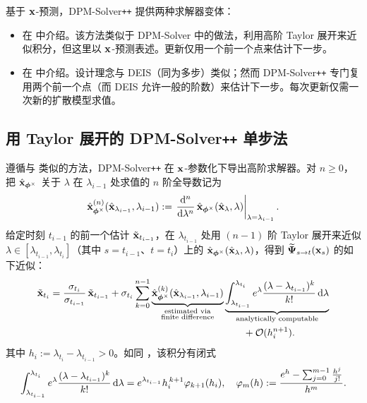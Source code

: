 基于 ${\mathbf{x}}$-预测，DPM-Solver\texttt{++} 提供两种求解器变体：
\begin{itemize}
    \item {} 在  中介绍。该方法类似于 DPM-Solver 中的做法，利用高阶 Taylor 展开来近似积分，但这里以 ${\mathbf{x}}$-预测表述。更新仅用一个前一个点来估计下一步。
    \item {} 在  中介绍。设计理念与 DEIS（同为多步）类似；然而 DPM-Solver\texttt{++} 专门复用两个前一个点（而 DEIS 允许一般的阶数）来估计下一步。每次更新仅需一次新的扩散模型求值。
\end{itemize}


\subsection{用 Taylor 展开的 DPM-Solver\texttt{++} 单步法}\label{subsec:dpm-solver++-single}
遵循与  类似的方法，DPM-Solver\texttt{++} 在 ${\mathbf{x}}$-参数化下导出高阶求解器。对 $n \ge 0$，把 $\hat{{\mathbf{x}}}_{{\bm{\phi}}^\times}$ 关于 $\lambda$ 在 $\lambda_{i-1}$ 处求值的 $n$ 阶全导数记为
\[
\hat{{\mathbf{x}}}_{{\bm{\phi}}^\times}^{(n)}(\hat{{\mathbf{x}}}_{\lambda_{i-1}}, \lambda_{i-1})
:= \left.\frac{\mathop{}\!\mathrm{d}^{n}}{\mathop{}\!\mathrm{d} \lambda^{n}}\,
\hat{{\mathbf{x}}}_{{\bm{\phi}}^\times}(\hat{{\mathbf{x}}}_\lambda, \lambda)\right|_{\lambda=\lambda_{i-1}}.
\]
给定时刻 $t_{i-1}$ 的前一个估计 $\tilde{{\mathbf{x}}}_{t_{i-1}}$，在 $\lambda_{t_{i-1}}$ 处用 $(n-1)$ 阶 Taylor 展开来近似 $\lambda \in [\lambda_{t_{i-1}},\lambda_{t_i}]$（其中 $s=t_{i-1}$、$t=t_i$）上的 $\hat{{\mathbf{x}}}_{\bm{\phi}^\times}(\hat{{\mathbf{x}}}_\lambda, \lambda)$，得到 $\widetilde{{\bm{\Psi}}}_{s\to t}({\mathbf{x}}_s)$ 的如下近似：
\begin{align*} 
\tilde{{\mathbf{x}}}_{t_i} = \frac{\sigma_{t_i}}{\sigma_{t_{i-1}}}\,\tilde{{\mathbf{x}}}_{t_{i-1}} + \sigma_{t_i} \sum_{k=0}^{n-1} \underbrace{\hat{{\mathbf{x}}}_{{\bm{\phi}}^\times}^{(k)}(\hat{{\mathbf{x}}}_{\lambda_{i-1}}, \lambda_{i-1})}_{\substack{\text{estimated via} \\ \text{finite difference}}} &\underbrace{\int_{\lambda_{t_{i-1}}}^{\lambda_{t_{i}}}e^\lambda \frac{(\lambda - \lambda_{t_{i-1}})^k}{k!} \mathop{}\!\mathrm{d} \lambda}_{\mathrm{analytically\,\,computable}} 
\\ &\quad\quad+ \mathcal O(h_i^{n+1}). 
\end{align*}
其中 $h_i:=\lambda_{t_i}-\lambda_{t_{i-1}}>0$。如同 ，该积分有闭式
\[
\int_{\lambda_{t_{i-1}}}^{\lambda_{t_i}}
e^\lambda \frac{(\lambda-\lambda_{t_{i-1}})^k}{k!} \mathop{}\!\mathrm{d}\lambda
=
e^{\lambda_{t_{i-1}}} h_i^{\,k+1} \varphi_{k+1}(h_i),
\quad
\varphi_{m}(h):=\frac{e^{h}-\sum_{j=0}^{m-1} \frac{h^{j}}{j!}}{h^{m}}.
\]

